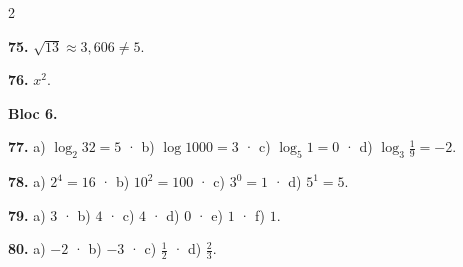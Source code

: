 \documentclass[13pt,a4paper]{extarticle}
\begin{document}
\begin{multicols}{2}
\begin{minipage}{\linewidth}
\end{minipage}\par\vspace{1.6mm}
\par\noindent\begin{minipage}{\linewidth}
\textbf{75.} $\sqrt{13}\approx3{,}606\neq5$.\par
\end{minipage}\par\vspace{1.6mm}
\par\noindent\begin{minipage}{\linewidth}
\textbf{76.} $x^2$.\par

\textbf{Bloc 6.}\par
\end{minipage}\par\vspace{1.6mm}
\par\noindent\begin{minipage}{\linewidth}
\textbf{77.} a) $\log_2 32=5$ · b) $\log 1000=3$ · c) $\log_5 1=0$ · d) $\log_3\tfrac19=-2$.\par
\end{minipage}\par\vspace{1.6mm}
\par\noindent\begin{minipage}{\linewidth}
\textbf{78.} a) $2^4=16$ · b) $10^2=100$ · c) $3^0=1$ · d) $5^1=5$.\par
\end{minipage}\par\vspace{1.6mm}
\par\noindent\begin{minipage}{\linewidth}
\textbf{79.} a) $3$ · b) $4$ · c) $4$ · d) $0$ · e) $1$ · f) $1$.\par
\end{minipage}\par\vspace{1.6mm}
\par\noindent\begin{minipage}{\linewidth}
\textbf{80.} a) $-2$ · b) $-3$ · c) $\tfrac12$ · d) $\tfrac23$.\par
\end{minipage}\par\vspace{1.6mm}
\par\noindent\begin{minipage}{\linewidth}

\end{minipage}
\end{multicols}
\end{document}
